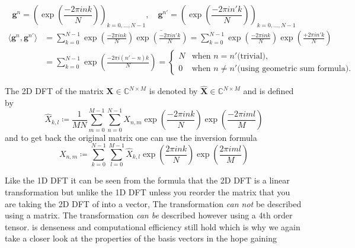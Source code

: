 \begin{Proof}
    \begin{equation}
        \boldsymbol{g}^n = \left(\exp\left({\frac{-2\pi ink}{N}}\right)\right)_{k=0,\ldots,N-1}, \quad \boldsymbol{g}^{n'} = \left(\exp\left({\frac{-2\pi in'k}{N}}\right)\right)_{k=0,\ldots,N-1}
    \end{equation}
    \begin{equation}
    \begin{split} 
        \langle\boldsymbol{g}^n,\boldsymbol{g}^{n'}\rangle &= \sum_{k=0}^{N-1} \exp\left({\frac{-2\pi ink}{N}}\right)\overline{\exp\left({\frac{-2\pi in'k}{N}}\right)}
        = \sum_{k=0}^{N-1} \exp\left({\frac{-2\pi ink}{N}}\right)\exp\left({\frac{+2\pi in'k}{N}}\right)\\
        &= \sum_{k=0}^{N-1} \exp\left({\frac{-2\pi i(n'-n)k}{N}}\right)=
        \begin{cases}
            N & \text{when $n = n'$}\text{(trivial)},\\
            0 & \text{when $n\neq n'$}\text{(using geometric sum formula)}.
        \end{cases}
    \end{split}
\end{equation}    
\end{Proof}
\begin{Def}[2D \ac{DFT}]\label{def:2ddft}
    The 2D \ac{DFT} of the matrix $\boldsymbol{X} \in \mathbb{C}^{N \times M}$ is denoted by 
    $\hat {\boldsymbol{X}} \in \mathbb{C}^{N \times M}$ and is defined by
    \begin{equation}\label{eq:2ddft}
        {\hat X}_{k,l} \coloneqq \frac{1}{MN}\sum_{m=0}^{M-1}\sum_{n=0}^{N-1} X_{n,m}\exp\left({\frac{-2\pi ink}{N}}\right)\exp\left({\frac{-2\pi iml}{M}}\right)
    \end{equation}
    and to get back the original matrix one can use the inversion formula
    \begin{equation}\label{eq:2didft}
        X_{n,m} \coloneqq \sum_{k=0}^{N-1}\sum_{l=0}^{M-1}{\hat X}_{k,l}\exp\left({\frac{2\pi ink}{N}}\right)\exp\left({\frac{2\pi iml}{M}}\right)
    \end{equation}    
\end{Def}

\begin{Rem}
Like the 1D \ac{DFT} it can be seen from the formula that the 2D \ac{DFT} is a linear transformation but unlike the 1D \ac{DFT}
unless you reorder the matrix that you are taking the 2D \ac{DFT} of into a vector, The transformation \emph{can not} be described using a matrix. The transformation \emph{can be} described however using a 4th order tensor. 
is denseness and computational efficiency still hold which is why we again take a closer look at the properties of the basis vectors in the hope gaining
\end{Rem}


